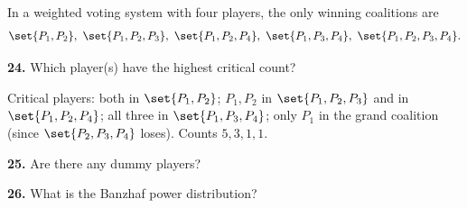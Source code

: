 \documentclass[12pt]{ximera}
\begin{document}
\begin{problem}
In a weighted voting system with four players, the only winning coalitions are
\[
\set{P_1,P_2},\ \set{P_1,P_2,P_3},\ \set{P_1,P_2,P_4},\ \set{P_1,P_3,P_4},\ \set{P_1,P_2,P_3,P_4}.
\]

\begin{prompt}
\textbf{24.} Which player(s) have the highest critical count?
\begin{multipleChoice}
\end{multipleChoice}
\begin{feedback}
Critical players: both in $\set{P_1,P_2}$; $P_1,P_2$ in $\set{P_1,P_2,P_3}$ and in
$\set{P_1,P_2,P_4}$; all three in $\set{P_1,P_3,P_4}$; only $P_1$ in the grand coalition
(since $\set{P_2,P_3,P_4}$ loses). Counts $5,3,1,1$.
\end{feedback}
\end{prompt}

\begin{prompt}
\textbf{25.} Are there any dummy players?
\begin{multipleChoice}
\end{multipleChoice}
\end{prompt}

\begin{prompt}
\textbf{26.} What is the Banzhaf power distribution?
\begin{multipleChoice}
\end{multipleChoice}
\end{prompt}
\end{problem}
\end{document}

